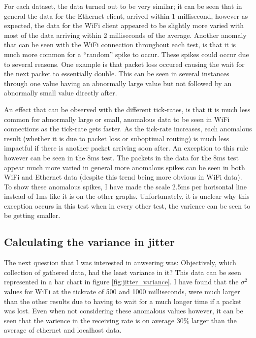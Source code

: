 For each dataset, the data turned out to be very similar; it can be seen that in general the data for the Ethernet client, arrived within 1 millisecond, however as expected, the data for the WiFi client appeared to be slightly more varied with most of the data arriving within 2 milliseconds of the average. Another anomaly that can be seen with the WiFi connection throughout each test, is that it is much more common for a ``random'' spike to occur. These spikes could occur due to several reasons. One example is that packet loss occured causing the wait for the next packet to essentially double. This can be seen in several instances through one value having an abnormally large value but not followed by an abnormally small value directly after.

An effect that can be observed with the different tick-rates, is that it is much less common for abnormally large or small, anomalous data to be seen in WiFi connections as the tick-rate gets faster. As the tick-rate increases, each anomalous result (whether it is due to packet loss or suboptimal routing) is much less impactful if there is another packet arriving soon after. An exception to this rule however can be seen in the 8ms test. The packets in the data for the 8ms test appear much more varied in general more anomalous spikes can be seen in both WiFi and Ethernet data (despite this trend being more obvious in WiFi data). To show these anomalous spikes, I have made the scale 2.5ms per horisontal line instead of 1ms like it is on the other graphs. Unfortunately, it is unclear why this exception occurs in this test when in every other test, the varience can be seen to be getting smaller.

\newpage



\subsection{Calculating the variance in jitter}\label{sec:variance_results}
The next question that I was interested in anwsering was: Objectively, which collection of gathered data, had the least variance in it? This data can be seen represented in a bar chart in figure \ref{fig:jitter_variance}. I have found that the $\sigma^2$ values for WiFi at the tickrate of 500 and 1000 milliseconds, were much larger than the other results due to having to wait for a much longer time if a packet was lost. Even when not considering these anomalous values however, it can be seen that the varience in the receiving rate is on average 30\% larger than the average of ethernet and localhost data.

